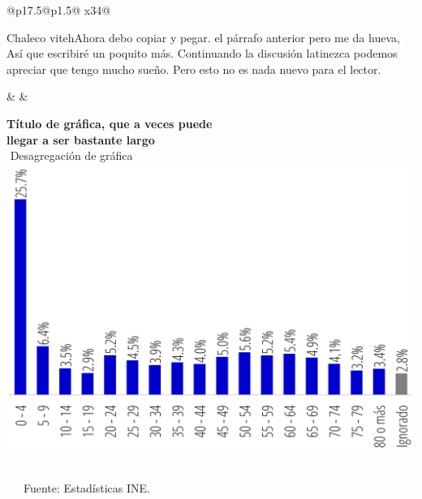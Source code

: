\begin{cajita-arriba}
\begin{tabular}[b]{@{}p{17.5\cuadri}@{}p{1.5\cuadri}@{} x{34\cuadri}@{}}
\begin{descripcion-cajita}
Chaleco viteh\llamada Ahora debo copiar y pegar. el párrafo anterior pero me da hueva,  Así que escribiré un poquito más. Continuando la discusión latinezca podemos apreciar que tengo mucho sueño.  Pero esto no es nada nuevo para el lector.
\end{descripcion-cajita}
  & &
\begin{grafica-cajita}
\begin{center}
\textbf{Título de gráfica, que a veces puede\\ 
llegar a ser bastante largo}\\[-1pt]
{\footnotesize\texttwelveudash$\,\,$Desagregación de gráfica$\,\,$\texttwelveudash}\\[0.6\cuadri]
\includegraphics[width=32\cuadri]{plot.pdf}
\begin{flushleft}
$\ $\\[-2\cuadri]
\ \ \ \footnotesize Fuente: Estadísticas INE.
\end{flushleft}
\end{center}

\end{grafica-cajita}
\end{tabular}

\end{cajita-arriba}



